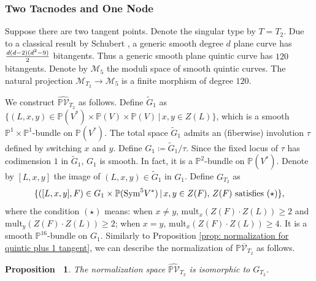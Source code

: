 \documentclass[12pt,reqno,a4paper]{amsart}
\newtheorem{prop}[thm]{Proposition~}
\theoremstyle{remark}
\theoremstyle{definition}
\newcommand{\PP}{\mathbb{P}}
\newcommand{\calM}{\mathcal{M}}
\newcommand{\calV}{\mathcal{V}}
\newcommand\Sym{\mathrm{Sym}}
\newcommand{\mult}{\mathrm{mult}}
\newcommand{\red}{\textcolor{red}}
\begin{document}


\subsubsection{Two Tacnodes and One Node}

Suppose there are two tangent points. Denote the singular type by $T=T_2$.
Due to a classical result by Schubert \cite{schubert1879kalkul}, a generic smooth degree $d$ plane curve has $d(d-2)(d^2-9)\over2$ bitangents.
Thus a generic smooth plane quintic curve has $120$ bitangents.
Denote by $\calM_5$ the moduli space of smooth quintic curves.
The natural projection $\calM_{T_2}\to \calM_5$ is a finite morphism of degree $120$.

We construct $\widehat{\PP\calV}_{T_2}$ as follows.
Define $\widetilde{G}_1$ as $\{ (L,x,y)\in\PP(V^*)\times\PP(V)\times\PP(V) \,|\, x,y\in Z(L) \}$, which is a smooth $\PP^1\times\PP^1$-bundle on $\PP(V^*)$.
The total space $\widetilde{G}_1$ admits an (fiberwise) involution $\tau$ defined by switching $x$ and $y$.
Define $G_1\coloneqq \widetilde{G}_1/\tau$. Since the fixed locus of $\tau$ has codimension $1$ in $\widetilde{G}_1$, $G_1$ is smooth. In fact, it is a $\PP^2$-bundle on $\PP(V^*)$. Denote by $[L,x,y]$ the image of $(L,x,y)\in\widetilde{G}_1$ in $G_1$.
Define $G_{T_2}$ as 
\begin{equation*}
    \{ ([L,x,y],F)\in G_1\times\PP(\Sym^5 V^*) \,|\, x,y\in Z(F),\, Z(F)\textup{ satisfies }(\star) \},
\end{equation*}
where the condition $(\star)$ means: when $x\ne y$, $\mult_x (Z(F)\cdot Z(L))\ge 2$ and $\mult_y (Z(F)\cdot Z(L))\ge 2$; when $x=y$, $\mult_x(Z(F)\cdot Z(L))\ge 4$. 
It is a smooth $\PP^{16}$-bundle on $G_1$. Similarly to Proposition \ref{prop: normalization for quintic plus 1 tangent}, we can describe the normalization of $\PP\overline{\calV}_{T_2}$ as follows.
\begin{prop}
    The normalization space $\widehat{\PP\calV}_{T_2}$ is isomorphic to $G_{T_2}$.
\end{prop}
\end{document}
